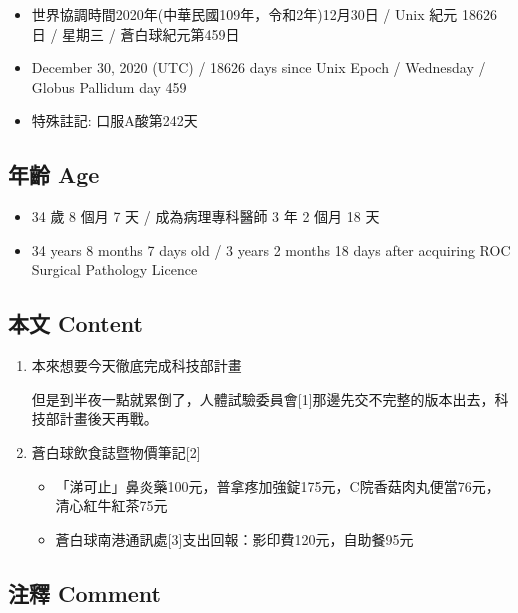 \documentclass[
]{article}
\providecommand{\tightlist}{%
  \setlength{\itemsep}{0pt}\setlength{\parskip}{0pt}}
\begin{document}
\begin{itemize}
\tightlist
\item
  世界協調時間2020年(中華民國109年，令和2年)12月30日 / Unix 紀元 18626
  日 / 星期三 / 蒼白球紀元第459日
\item
  December 30, 2020 (UTC) / 18626 days since Unix Epoch / Wednesday /
  Globus Pallidum day 459
\item
  特殊註記: 口服A酸第242天
\end{itemize}

\hypertarget{ux5e74ux9f61-age-29}{%
\subsection{年齡 Age}\label{ux5e74ux9f61-age-29}}

\begin{itemize}
\tightlist
\item
  34 歲 8 個月 7 天 / 成為病理專科醫師 3 年 2 個月 18 天
\item
  34 years 8 months 7 days old / 3 years 2 months 18 days after
  acquiring ROC Surgical Pathology Licence
\end{itemize}

\hypertarget{ux672cux6587-content-29}{%
\subsection{本文 Content}\label{ux672cux6587-content-29}}

\begin{enumerate}
\def\labelenumi{\arabic{enumi}.}
\item
  本來想要今天徹底完成科技部計畫

  但是到半夜一點就累倒了，人體試驗委員會{[}1{]}那邊先交不完整的版本出去，科技部計畫後天再戰。
\item
  蒼白球飲食誌暨物價筆記{[}2{]}

  \begin{itemize}
  \tightlist
  \item
    「涕可止」鼻炎藥100元，普拿疼加強錠175元，C院香菇肉丸便當76元，清心紅牛紅茶75元
  \item
    蒼白球南港通訊處{[}3{]}支出回報：影印費120元，自助餐95元
  \end{itemize}
\end{enumerate}

\hypertarget{ux6ce8ux91cb-comment-29}{%
\subsection{注釋 Comment}\label{ux6ce8ux91cb-comment-29}}
\end{document}
